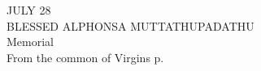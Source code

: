 \begin{center}\normalsize JULY 28\\
\footnotesize BLESSED ALPHONSA MUTTATHUPADATHU\\
\footnotesize Memorial\\
\footnotesize From the common of Virgins p. \\
\end{center}

